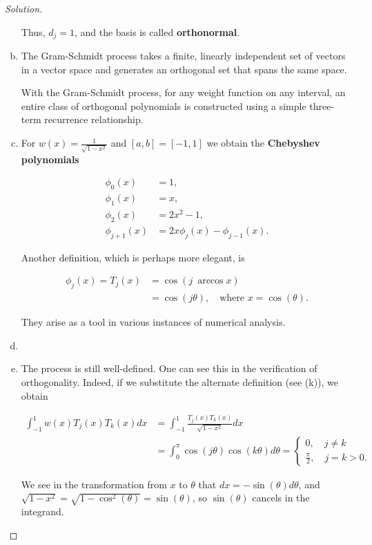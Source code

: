 \documentclass[12pt,a4]{article}
\theoremstyle{definition}
\begin{document}
\begin{proof}[Solution]
\begin{enumerate}[(a)]
		\noindent Thus, $d_j = 1$, and the basis is called \textbf{orthonormal}. 
				
		\item The Gram-Schmidt process takes a finite, linearly independent set of vectors in a vector space and generates an orthogonal set that spans the same space. 
		
		With the Gram-Schmidt process, for any weight function on any interval, an entire class of orthogonal polynomials is constructed using a simple three-term recurrence relationship. 
		
		\item For $w(x) = \frac{1}{\sqrt{1 - x^2}}$ and $[a, b] = [-1, 1]$ we obtain the \textbf{Chebyshev polynomials}
		
		\begin{align*}
		\phi_0(x) &= 1 {,} \\
		\phi_1(x) &= x {,} \\
		\phi_2(x) &= 2 x^2 - 1 {,} \\
		\phi_{j + 1}(x) &= 2 x \phi_j(x) - \phi_{j - 1}(x) {.}
		\end{align*}
		
		\noindent Another definition, which is perhaps more elegant, is 
		
		\begin{align*}
		\phi_j(x) = T_j(x) &= \cos(j \ \arccos{x}) \\
		 &= \cos(j \theta) {,} \quad \text{where } x = \cos(\theta) {.}
		\end{align*}
		
		\noindent They arise as a tool in various instances of numerical analysis.
		
		\item 
		
		\item The process is still well-defined. One can see this in the verification of orthogonality. Indeed, if we substitute the alternate definition (see (k)), we obtain 
		
		\begin{align*}
		\int_{-1}^1 w(x) T_j(x) T_k(x) dx &= \int_{-1}^1 \frac{T_j(x) T_k(x)}{\sqrt{1 - x^2}} dx \\
		 &= \int_0^\pi \cos(j \theta) \cos(k \theta) d\theta = \begin{cases} 
		 0 {,} \quad j \neq k \\
		 \frac{\pi}{2} {,} \quad j = k > 0 {.}
		 \end{cases}
		\end{align*}
		
		\noindent We see in the transformation from $x$ to $\theta$ that $dx = - \sin(\theta) d\theta$, and $\sqrt{1 - x^2} = \sqrt{1 - \cos^2(\theta)} = \sin(\theta)$, so $\sin(\theta)$ cancels in the integrand. 
	\end{enumerate}
\end{proof}
\end{document}
